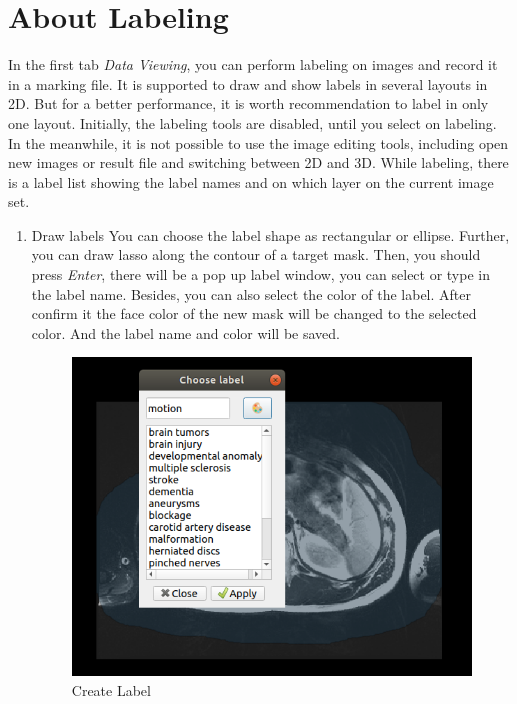 \documentclass[12pt]{article}
\begin{document}
\graphicspath{ {images/} }
\section*{About Labeling}

In the first tab \textit{Data Viewing}, you can perform labeling on images and record it in a marking file. It is supported to draw and show labels in several layouts in 2D. But for a better performance, it is worth recommendation to label in only one layout. Initially, the labeling tools are disabled, until you select on labeling. In the meanwhile, it is not possible to use the image editing tools, including open new images or result file and switching between 2D and 3D. While labeling, there is a label list showing the label names and on which layer on the current image set.
\begin{enumerate}
	\item Draw labels
	\newline You can choose the label shape as rectangular or ellipse. Further, you can draw lasso along the contour of a target mask. Then, you should press \textit{Enter}, there will be a pop up label window, you can select or type in the label name. Besides, you can also select the color of the label. After confirm it the face color of the new mask will be changed to the selected color. And the label name and color will be saved.
	\begin{figure}[htbp]	
		\centering
		\includegraphics[width=\linewidth]{create_label.png}
		\caption[Create Label]{Create Label}
		\label{fig:create_label}

\end{figure}
\end{enumerate}
\end{document}
